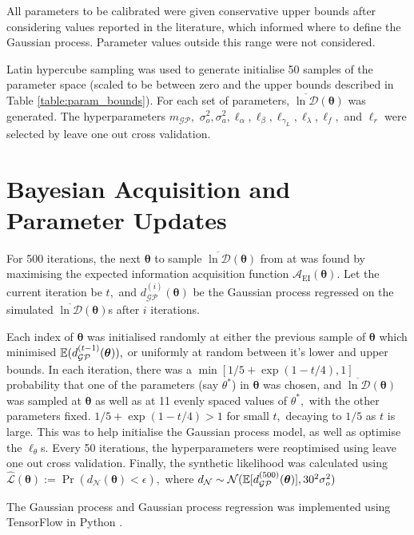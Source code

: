 All parameters to be calibrated were given conservative upper bounds after
considering values reported in the literature, which informed where to define
the Gaussian process. Parameter values outside this range were not considered.

Latin hypercube sampling was used to generate initialise 50 samples of the
parameter space (scaled to be between zero and the upper bounds described in
Table \ref{table:param_bounds}). For each set of parameters,
$\overline{\ln\mathcal{D}}(\bm{\theta})$ was generated. The hyper\-parameters
$m_\mathcal{GP},$ $\sigma_o^2, \sigma_a^2, \ell_\alpha,
    \ell_\beta, \ell_{\gamma_L}, \ell_\lambda, \ell_f,$
and $\ell_r$ were selected by leave one out cross validation.

\section{Bayesian Acquisition and Parameter Updates}

For 500 iterations, the next $\bm{\theta}$ to sample
$\overline{\ln\mathcal{D}}(\bm{\theta})$ from
at was found by maximising the expected information acquisition function
$\mathcal{A}_\text{EI}(\bm{\theta})$.
Let the current iteration be $t,$ and $d_\mathcal{GP}^{(i)}(\bm{\theta})$
be the Gaussian process regressed on the
simulated $\overline{\ln\mathcal{D}}(\bm{\theta})$s after $i$ iterations.

Each index of $\bm{\theta}$ was initialised randomly at either the
previous sample of $\bm{\theta}$
which minimised $\operatorname{\mathbb{E}}(d_\mathcal{GP}^{(t-1)}(\bm{\theta})),$ or uniformly at
random between it's lower and upper bounds. In each iteration, there was a
$\min\left[1/5 + \exp(1 - t/4), 1 \right]$ probability that one of the
parameters (say $\theta^*$) in $\bm{\theta}$
was chosen, and $\overline{\ln\mathcal{D}}(\bm{\theta})$ was sampled at
$\bm{\theta}$ as well as at 11 evenly spaced values of
$\theta^*,$ with the other parameters fixed.
$1/5 + \exp(1 - t/4)>1$ for small $t,$ decaying to $1/5$ as $t$ is
large. This was to help initialise the Gaussian process model, as well as
optimise the $\ell_\theta$s. Every 50 iterations, the hyperparameters were
reoptimised using leave one out cross validation. Finally, the synthetic
likelihood was calculated using
$\hat{\mathcal{L}}(\bm{\theta}) := \Pr(d_\mathcal{N}(\bm{\theta}) < \epsilon),$
where
$d_\mathcal{N}
    \sim \mathcal{N}(\operatorname{\mathbb{E}}[d_\mathcal{GP}^{(500)}(\bm{\theta})], 30^2\sigma_o^2)$

The Gaussian process and Gaussian process regression was implemented using
TensorFlow in Python \parencite{abadi_tensorflow_2015}.

